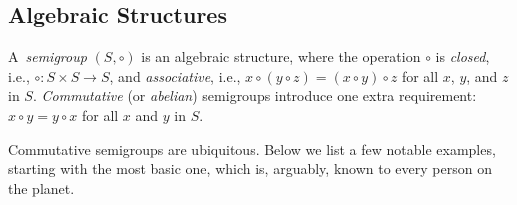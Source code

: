 \subsection{Algebraic Structures}\label{subsec:algstr}

A~\emph{semigroup} $(S, \circ)$ is an algebraic structure, where the operation
$\circ$ is \emph{closed}, i.e., $\circ : S\times S \rightarrow S$, and
\emph{associative}, i.e.,
$x \circ (y \circ z) = (x \circ y) \circ z$ for all $x$, $y$, and $z$ in $S$.
\emph{Commutative} (or \emph{abelian}) semigroups introduce one extra
requirement: $x \circ y = y \circ x$ for all $x$ and $y$ in $S$.

Commutative semigroups are ubiquitous. Below we list a few
notable examples, starting with the most basic one, which is, arguably, known
to every person on the planet.


